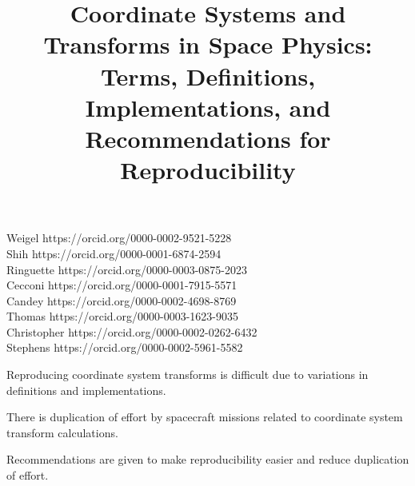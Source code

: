 \documentclass[draft]{agujournal2019}
\begin{document}
\title{Coordinate Systems and Transforms in Space Physics: Terms, Definitions,  Implementations, and Recommendations for Reproducibility}





\noindent
Weigel https://orcid.org/0000-0002-9521-5228\\
Shih https://orcid.org/0000-0001-6874-2594\\
Ringuette https://orcid.org/0000-0003-0875-2023\\
Cecconi https://orcid.org/0000-0001-7915-5571\\
Candey https://orcid.org/0000-0002-4698-8769\\
Thomas https://orcid.org/0000-0003-1623-9035\\
Christopher https://orcid.org/0000-0002-0262-6432\\
Stephens https://orcid.org/0000-0002-5961-5582\\
\vspace{0.2in}




\begin{keypoints}
\item Reproducing coordinate system transforms is difficult due to variations in definitions and implementations.
\item There is duplication of effort by spacecraft missions related to coordinate system transform calculations.
\item Recommendations are given to make reproducibility easier and reduce duplication of effort.
\end{keypoints}
\end{document}
